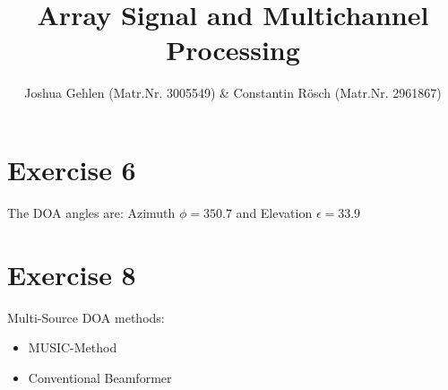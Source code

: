 \documentclass[]{scrartcl}
\title{Array Signal and Multichannel Processing}
\author{Joshua Gehlen (Matr.Nr. 3005549) \& Constantin R\"osch (Matr.Nr. 2961867)}
\begin{document}
\maketitle


\section*{Exercise 6}
The DOA angles are: Azimuth $\phi = 350.7$ and Elevation $\epsilon = 33.9$\\

\section*{Exercise 8}

Multi-Source DOA methods:

\begin{itemize}
  \item MUSIC-Method
  \item Conventional Beamformer
\end{itemize}
\end{document}
